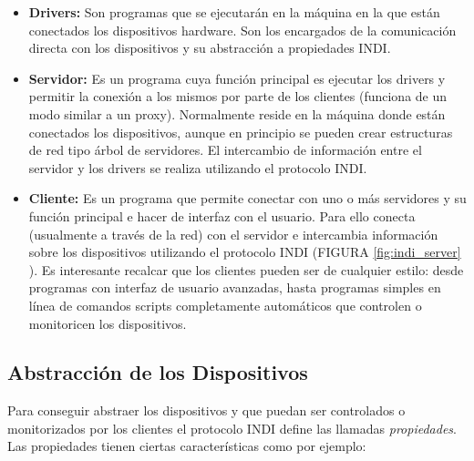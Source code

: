 \begin{itemize}
  \item \textbf{Drivers:} Son programas que se ejecutarán en la máquina en la que están conectados los dispositivos hardware. Son los encargados de la comunicación directa con los dispositivos y su abstracción a propiedades INDI.
  
  \item \textbf{Servidor:} Es un programa cuya función principal es ejecutar los drivers y permitir la conexión a los mismos por parte de los clientes (funciona de un modo similar a un proxy). Normalmente reside en la máquina donde están conectados los dispositivos, aunque en principio se pueden crear estructuras de red tipo árbol de servidores. El intercambio de información entre el servidor y los drivers se realiza utilizando el protocolo INDI.
  
  \item \textbf{Cliente:} Es un programa que permite conectar con uno o más servidores y su función principal e hacer de interfaz con el usuario. Para ello conecta (usualmente a través de la red) con el servidor e intercambia información sobre los dispositivos utilizando el protocolo INDI (FIGURA \ref{fig:indi_server} ). Es interesante recalcar que los clientes pueden ser de cualquier estilo: desde programas con interfaz de usuario avanzadas, hasta programas simples en línea de comandos scripts completamente automáticos que controlen o monitoricen los dispositivos.
\end{itemize}


\subsection{Abstracción de los Dispositivos}

Para conseguir abstraer los dispositivos y que puedan ser controlados o monitorizados por los clientes el protocolo INDI define las llamadas \textit{propiedades}. Las propiedades tienen ciertas características como por ejemplo:

